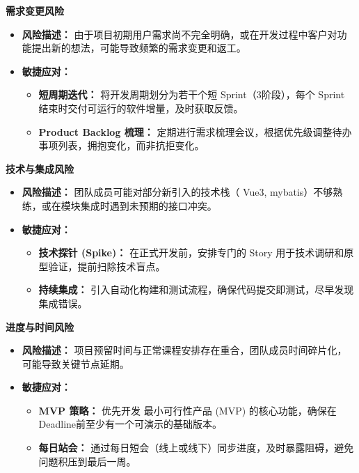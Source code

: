 \begin{levellist}
    \item \textbf{需求变更风险}
    \begin{itemize}
        \item \textbf{风险描述：} 由于项目初期用户需求尚不完全明确，或在开发过程中客户对功能提出新的想法，可能导致频繁的需求变更和返工。
        \item \textbf{敏捷应对：}
              \begin{itemize}
                  \item \textbf{短周期迭代：} 将开发周期划分为若干个短 Sprint（3阶段），每个 Sprint 结束时交付可运行的软件增量，及时获取反馈。
                  \item \textbf{Product Backlog 梳理：} 定期进行需求梳理会议，根据优先级调整待办事项列表，拥抱变化，而非抗拒变化。
              \end{itemize}
    \end{itemize}

    \item \textbf{技术与集成风险}
    \begin{itemize}
        \item \textbf{风险描述：} 团队成员可能对部分新引入的技术栈（ Vue3, mybatis）不够熟练，或在模块集成时遇到未预期的接口冲突。
        \item \textbf{敏捷应对：}
              \begin{itemize}
                  \item \textbf{技术探针 (Spike)：}  在正式开发前，安排专门的 Story 用于技术调研和原型验证，提前扫除技术盲点。
                  \item \textbf{持续集成：} 引入自动化构建和测试流程，确保代码提交即测试，尽早发现集成错误。
              \end{itemize}
    \end{itemize}

    \item \textbf{进度与时间风险}
    \begin{itemize}
        \item \textbf{风险描述：} 项目预留时间与正常课程安排存在重合，团队成员时间碎片化，可能导致关键节点延期。
        \item \textbf{敏捷应对：}
              \begin{itemize}
                  \item \textbf{MVP 策略：} 优先开发 最小可行性产品 (MVP) 的核心功能，确保在Deadline前至少有一个可演示的基础版本。
                  \item \textbf{每日站会：} 通过每日短会（线上或线下）同步进度，及时暴露阻碍，避免问题积压到最后一周。
              \end{itemize}
    \end{itemize}


\end{levellist}
